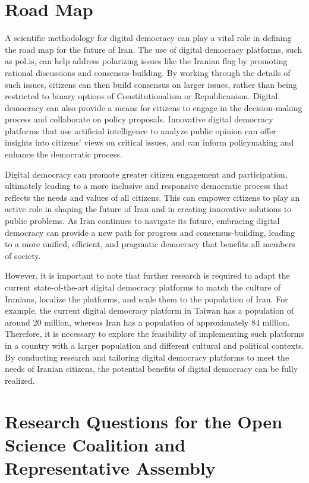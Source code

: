 \documentclass{IEEEtran}
\begin{document}
\section{Road Map}

A scientific methodology for digital democracy can play a vital role in defining the road map for the future of Iran. The use of digital democracy platforms, such as pol.is, can help address polarizing issues like the Iranian flag by promoting rational discussions and consensus-building. By working through the details of such issues, citizens can then build consensus on larger issues, rather than being restricted to binary options of Constitutionalism or Republicanism.
Digital democracy can also provide a means for citizens to engage in the decision-making process and collaborate on policy proposals. Innovative digital democracy platforms that use artificial intelligence to analyze public opinion can offer insights into citizens' views on critical issues, and can inform policymaking and enhance the democratic process.

Digital democracy can promote greater citizen engagement and participation, ultimately leading to a more inclusive and responsive democratic process that reflects the needs and values of all citizens. This can empower citizens to play an active role in shaping the future of Iran and in creating innovative solutions to public problems.
As Iran continues to navigate its future, embracing digital democracy can provide a new path for progress and consensus-building, leading to a more unified, efficient, and pragmatic democracy that benefits all members of society.

However, it is important to note that further research is required to adapt the current state-of-the-art digital democracy platforms to match the culture of Iranians, localize the platforms, and scale them to the population of Iran. For example, the current digital democracy platform in Taiwan has a population of around 20 million, whereas Iran has a population of approximately 84 million. Therefore, it is necessary to explore the feasibility of implementing such platforms in a country with a larger population and different cultural and political contexts. By conducting research and tailoring digital democracy platforms to meet the needs of Iranian citizens, the potential benefits of digital democracy can be fully realized.
\section{Research Questions for the Open Science Coalition and Representative Assembly}
\end{document}
